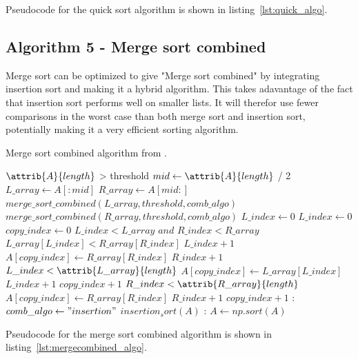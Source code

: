 \documentclass[sigconf, nonacm, natbib, screen, balance=False]{acmart}
\begin{document}
Pseudocode for the quick sort algorithm is shown in 
listing~\ref{lst:quick_algo}. 

\subsection{Algorithm 5 - Merge sort combined}\label{sec:algo2}

Merge sort can be optimized to give "Merge sort combined" by integrating insertion sort and making it a hybrid algorithm. This takes adavantage of the fact that insertion sort performs well on smaller lists. It will therefor use fewer comparisons in the worst case than both merge sort and insertion sort, potentially making it a very efficient sorting algorithm.  

\begin{listing}
  \caption{Merge sort combined algorithm from \citet[Ch.~2.1]{CLRS_2009}.}
  \label{lst:mergecombined_algo}
  
 \begin{codebox}
    \li \If $\attrib{A}{length}$ > threshold
    \li \Do
    $mid \gets \attrib{A}{length}$ / 2 
    \li $L\_array\gets A[:mid]$
    \li $R\_array\gets A[mid:]$
    \li $merge\_sort\_combined(L\_array, threshold, comb\_algo)$
    \li $merge\_sort\_combined(R\_array, threshold, comb\_algo)$
    \li $L\_index\gets 0$
    \li $L\_index\gets 0$
    \li $copy\_index\gets 0$
    \li \While $L\_index < L\_array$ $and$ $R\_index < R\_array$ 
    \li \Do
    \If $L\_array[L\_index] < R\_array[R\_index]$
    \li \Do
    $L\_index + 1$
    \li \Else
    \li $A[copy\_index] \gets R\_array[R\_index]$
    \li $R\_index + 1$
    \End
    \End
    \li \While $L\_index < \attrib{L\_array}{length}$
    \li \Do
    $A[copy\_index] \gets L\_array[L\_index]$
    \li $L\_index + 1$
    \li $copy\_index + 1$
    \End
    \li \While $R\_index < \attrib{R\_array}{length}$
    \li \Do
    $A[copy\_index] \gets R\_array[R\_index]$
    \li $R\_index + 1$
    \li $copy\_index + 1$
    \End
    \li \Else:
    \li \If $comb\_algo \gets "insertion"$
    \li \Do
    $insertion_sort(A)$
    \li \Else:
    $A \gets np.sort(A)$
  \end{codebox}
\end{listing}

Pseudocode for the merge sort combined algorithm is shown in listing~\ref{lst:mergecombined_algo}. 
\end{document}

